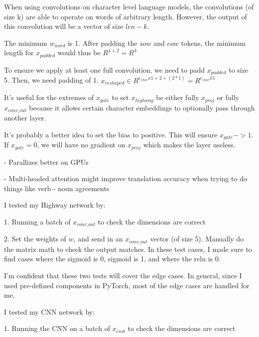 \documentclass[11pt,largemargins]{homework}
\begin{document}
\maketitle

\question

When using convolutions on character level language models, the convolutions (of size k) are able to operate on words of arbitrary length. However, the output of this convolution will be a vector of size $len - k$. 

\question

The minimum $w_{word}$ is 1. After padding the $sow$ and $eow$ tokens,  the minimum length for $x_{padded}$ would thus be $R^{1+2} = R^{3}$

To ensure we apply at least one full convolution, we need to padd $x_{padded}$ to size 5. Then, we need padding of 1. $x_{reshaped} \in R^{e_{char} x 1 + 2 + (2 * 1)} =  R^{e_{char} x 5}$

\question
It's useful for the extremes of $x_{gate}$ to set $x_{highway}$ be either fully $x_{proj}$ or fully $x_{conv\_out}$ because it allows certain character embeddings to optionally pass through another layer. 

It's probably a better idea to set the bias to positive. This will ensure $x_{gate} -> 1$. If $x_{gate} = 0$, we will have no gradient on $x_{proj}$ which makes the layer useless. 

\question

- Parallizes better on GPUs

- Multi-headed attention might improve translation accuracy when trying to do things like verb - noun agreements 

\question 

I tested my Highway network by:

1. Running a batch of $x_{conv\_out}$ to check the dimensions are correct 

2. Set the weights of $w$, and send in an $x_{conv\_out}$ vector (of size 5). Manually do the matrix math to check the output matches. In these test cases, I made sure to find cases where the sigmoid is 0, sigmoid is 1, and where the relu is 0. 

I'm confident that these two tests will cover the edge cases. In general, since I used pre-defined components in PyTorch, most of the edge cases are handled for me. 

\question 

I tested my CNN network by:

1. Running the CNN on a batch of $x_{emb}$ to check the dimensions are correct 
\end{document}
